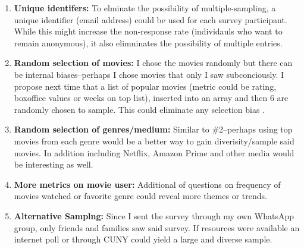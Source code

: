 \documentclass[
]{article}
\begin{document}
\begin{enumerate}
\def\labelenumi{\arabic{enumi}.}
\item
  \textbf{Unique identifers:} To elminate the possibility of
  multiple-sampling, a unique identifier (email address) could be used
  for each survey participant. While this might increase the
  non-response rate (individauls who want to remain anonymous), it also
  elimninates the possibility of multiple entries.
\item
  \textbf{Random selection of movies:} I chose the movies randomly but
  there can be internal biases--perhaps I chose movies that only I saw
  subconciously. I propose next time that a list of popular movies
  (metric could be rating, boxoffice values or weeks on top list),
  inserted into an array and then 6 are randomly chosen to sample. This
  could eliminate any selection bias .
\item
  \textbf{Random selection of genres/medium:} Similar to \#2--perhaps
  using top movies from each genre would be a better way to gain
  diverisity/sample said movies. In addition including Netflix, Amazon
  Prime and other media would be interesting as well.
\item
  \textbf{More metrics on movie user:} Additional of questions on
  frequency of movies watched or favorite genre could reveal more themes
  or trends.
\item
  \textbf{Alternative Samplng:} Since I sent the survey through my own
  WhatsApp group, only friends and families saw said survey. If
  resources were available an internet poll or through CUNY could yield
  a large and diverse sample.
\end{enumerate}
\end{document}
